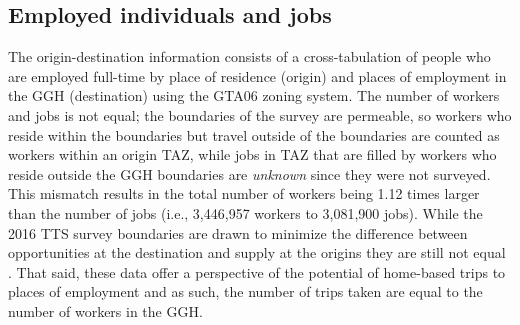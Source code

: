 \documentclass[Royal,times,sageh]{sagej}
\begin{document}
\begin{table}

\caption{\label{tab:creating-desc-stats-table}\label{tab:TTS-16-desc-stats}Descriptive statistics of the trips, workers, and jobs for the traffic analysis zones (TAZ) from the TTS 2016 dataset along with estimated car origin-destination travel times.}
\centering
{}
\end{table}

\hypertarget{employed-individuals-and-jobs}{%
\subsection{Employed individuals and
jobs}\label{employed-individuals-and-jobs}}

The origin-destination information consists of a cross-tabulation of
people who are employed full-time by place of residence (origin) and
places of employment in the GGH (destination) using the GTA06 zoning
system. The number of workers and jobs is not equal; the boundaries of
the survey are permeable, so workers who reside within the boundaries
but travel outside of the boundaries are counted as workers within an
origin TAZ, while jobs in TAZ that are filled by workers who reside
outside the GGH boundaries are \emph{unknown} since they were not
surveyed. This mismatch results in the total number of workers being
1.12 times larger than the number of jobs (i.e., 3,446,957 workers to
3,081,900 jobs). While the 2016 TTS survey boundaries are drawn to
minimize the difference between opportunities at the destination and
supply at the origins they are still not equal . That said, these data
offer a perspective of the potential of home-based trips to places of
employment and as such, the number of trips taken are equal to the
number of workers in the GGH.
\end{document}
